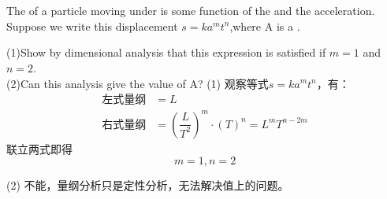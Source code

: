 \chapter[测量]{}
\begin{solution}[量纲分析]
    The  of a particle moving under  is some function of the  and
    the acceleration. Suppose we write this displacement
    $s=ka^mt^n$,where A is a .

    \tcbrule

    (1)Show by
    dimensional analysis that this expression is satisfied if
    $m = 1$ and $n = 2$. \\
    (2)Can this analysis give the value of A?
    (1) 观察等式$s=ka^mt^n$，有：
    \begin{align*}
        \text{左式量纲} & =L                                        \\
        \text{右式量纲} & =(\dfrac{L}{T^2})^m\cdot(T)^n=L^mT^{n-2m}
    \end{align*}
    联立两式即得
    \[m=1,n=2\]
    \par
    (2) 不能，量纲分析只是定性分析，无法解决值上的问题。
\end{solution}